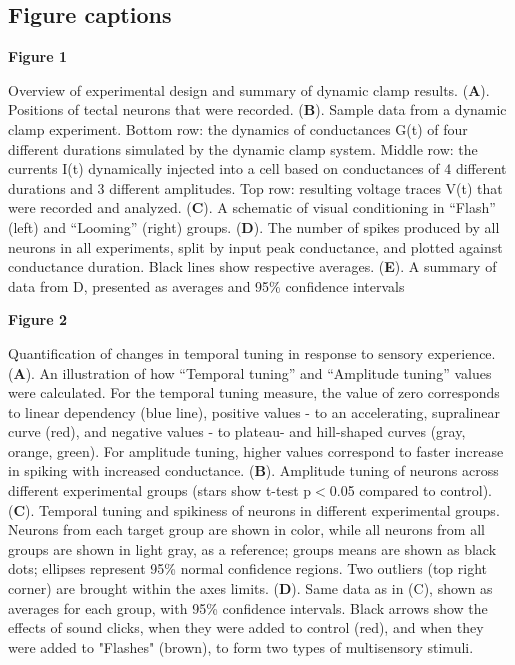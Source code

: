 \documentclass{article}
\begin{document}
\nolinenumbers




\subsection*{Figure captions}

\textbf{Figure 1}

Overview of experimental design and summary of dynamic clamp results. (\textbf{A}). Positions of tectal neurons that were recorded. (\textbf{B}). Sample data from a dynamic clamp experiment. Bottom row: the dynamics of conductances G(t) of four different durations simulated by the dynamic clamp system. Middle row: the currents I(t) dynamically injected into a cell based on conductances of 4 different durations and 3 different amplitudes. Top row: resulting voltage traces V(t) that were recorded and analyzed. (\textbf{C}). A schematic of visual conditioning in “Flash” (left) and “Looming” (right) groups. (\textbf{D}). The number of spikes produced by all neurons in all experiments, split by input peak conductance, and plotted against conductance duration. Black lines show respective averages. (\textbf{E}). A summary of data from D, presented as averages and 95\% confidence intervals

\textbf{Figure 2}

Quantification of changes in temporal tuning in response to sensory experience. (\textbf{A}). An illustration of how “Temporal tuning” and “Amplitude tuning” values were calculated. For the temporal tuning measure, the value of zero corresponds to linear dependency (blue line), positive values - to an accelerating, supralinear curve (red), and negative values - to plateau- and hill-shaped curves (gray, orange, green). For amplitude tuning, higher values correspond to faster increase in spiking with increased conductance. (\textbf{B}). Amplitude tuning of neurons across different experimental groups (stars show t-test p$<$0.05 compared to control). (\textbf{C}). Temporal tuning and spikiness of neurons in different experimental groups. Neurons from each target group are shown in color, while all neurons from all groups are shown in light gray, as a reference; groups means are shown as black dots; ellipses represent 95\% normal confidence regions. Two outliers (top right corner) are brought within the axes limits. (\textbf{D}). Same data as in (C), shown as averages for each group, with 95\% confidence intervals. Black arrows show the effects of sound clicks, when they were added to control (red), and when they were added to "Flashes" (brown), to form two types of multisensory stimuli.
\end{document}
